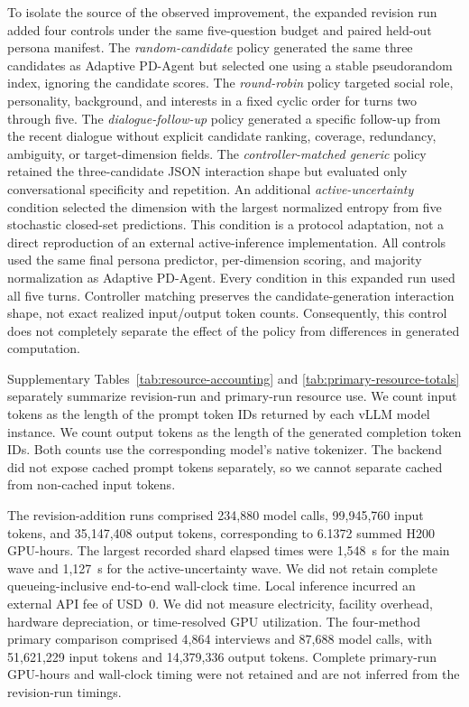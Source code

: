 \documentclass{ieeeaccess}
\begin{document}
To isolate the source of the observed improvement, the expanded revision run added four
controls under the same five-question budget and paired held-out persona manifest. The
\textit{random-candidate} policy generated the same three candidates as Adaptive PD-Agent
but selected one using a stable pseudorandom index, ignoring the candidate scores. The
\textit{round-robin} policy targeted social role, personality, background, and interests in
a fixed cyclic order for turns two through five. The \textit{dialogue-follow-up} policy
generated a specific follow-up from the recent dialogue without explicit candidate ranking,
coverage, redundancy, ambiguity, or target-dimension fields. The
\textit{controller-matched generic} policy retained the three-candidate JSON interaction
shape but evaluated only conversational specificity and repetition. An additional \textit{active-uncertainty} condition selected the dimension with the largest
normalized entropy from five stochastic closed-set predictions. This condition is a
protocol adaptation, not a direct reproduction of an external active-inference implementation. All controls
used the same final persona predictor, per-dimension scoring, and majority normalization as
Adaptive PD-Agent. Every condition in this expanded run used all five turns.
Controller matching preserves the candidate-generation interaction shape, not exact
realized input/output token counts. Consequently, this control does not completely
separate the effect of the policy from differences in generated computation.

Supplementary Tables~\ref{tab:resource-accounting} and \ref{tab:primary-resource-totals}
separately summarize revision-run and primary-run resource use. We count input tokens as the
length of the prompt token IDs returned by each vLLM model instance. We count output tokens
as the length of the generated completion token IDs. Both counts use the corresponding
model's native tokenizer. The backend did not expose cached prompt tokens separately,
so we cannot separate cached from non-cached input tokens.

The revision-addition runs comprised 234,880 model calls, 99,945,760 input tokens, and
35,147,408 output tokens, corresponding to 6.1372 summed H200 GPU-hours. The largest
recorded shard elapsed times were 1,548~s for the main wave and 1,127~s for the
active-uncertainty wave. We did not retain complete queueing-inclusive end-to-end wall-clock
time. Local inference incurred an external API fee of USD~0. We did not measure
electricity, facility overhead, hardware depreciation, or time-resolved GPU utilization.
The four-method primary comparison comprised 4,864 interviews and 87,688 model calls,
with 51,621,229 input tokens and 14,379,336 output tokens. Complete primary-run GPU-hours
and wall-clock timing were not retained and are not inferred from the revision-run timings.
\end{document}
